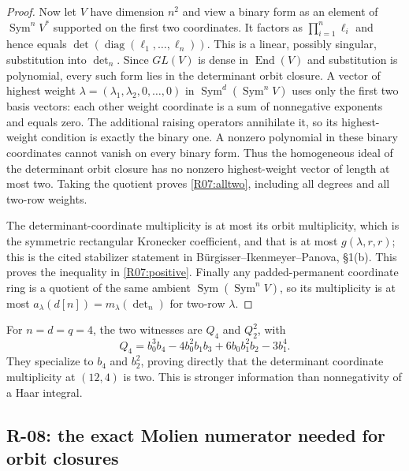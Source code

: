 \begin{proof}
Now let $V$ have dimension $n^2$ and view a binary form as an element
of $\operatorname{Sym}^nV^*$ supported on the first two coordinates.
It factors as $\prod_{i=1}^n\ell_i$ and hence equals
$\det(\operatorname{diag}(\ell_1,\ldots,\ell_n))$.
This is a linear, possibly singular, substitution into $\det_n$.
Since $GL(V)$ is dense in $\operatorname{End}(V)$ and substitution
is polynomial, every such form lies in the determinant orbit closure.
A vector of highest weight $\lambda=(\lambda_1,\lambda_2,0,\ldots,0)$
in $\operatorname{Sym}^d(\operatorname{Sym}^nV)$ uses only the first
two basis vectors: each other weight coordinate is a sum of
nonnegative exponents and equals zero. The additional raising
operators annihilate it, so its highest-weight condition is exactly
the binary one. A nonzero polynomial in these binary coordinates
cannot vanish on every binary form. Thus the homogeneous ideal of
the determinant orbit closure has no nonzero highest-weight vector
of length at most two. Taking the quotient proves
\eqref{R07:alltwo}, including all degrees and all two-row weights.

The determinant-coordinate multiplicity is at most its orbit
multiplicity, which is the symmetric rectangular Kronecker coefficient,
and that is at most $g(\lambda,r,r)$; this is the cited stabilizer
statement in B\"urgisser--Ikenmeyer--Panova, \S1(b).
This proves the inequality in \eqref{R07:positive}. Finally any
padded-permanent coordinate ring is a quotient of the same ambient
$\operatorname{Sym}(\operatorname{Sym}^nV)$, so its multiplicity is
at most $a_\lambda(d[n])=m_\lambda(\det_n)$ for two-row $\lambda$.
\end{proof}

For $n=d=q=4$, the two witnesses are $Q_4$ and $Q_2^2$, with
\[
 Q_4=b_0^3b_4-4b_0^2b_1b_3+6b_0b_1^2b_2-3b_1^4.
\]
They specialize to $b_4$ and $b_2^2$, proving directly that the
determinant coordinate multiplicity at $(12,4)$ is two. This is
stronger information than nonnegativity of a Haar integral.

\subsection{R-08: the exact Molien numerator needed for orbit closures}

